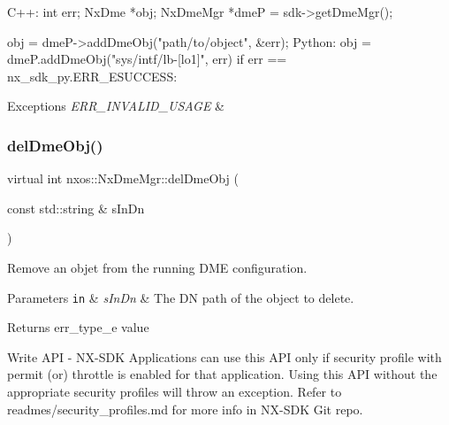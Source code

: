 \begin{DoxyCode}
C++:
    \textcolor{keywordtype}{int}   err;
    NxDme *obj;
    NxDmeMgr       *dmeP =  sdk->getDmeMgr();
    
    obj = dmeP->addDmeObj(\textcolor{stringliteral}{"path/to/object"}, &err);
Python:
    obj = dmeP.addDmeObj(\textcolor{stringliteral}{"sys/intf/lb-[lo1]"}, err)
    \textcolor{keywordflow}{if} err == nx\_sdk\_py.ERR\_ESUCCESS:
\end{DoxyCode}



\begin{DoxyExceptions}{Exceptions}
{\em E\+R\+R\+\_\+\+I\+N\+V\+A\+L\+I\+D\+\_\+\+U\+S\+A\+GE} & \\
\hline
\end{DoxyExceptions}
\mbox{\label{classnxos_1_1_nx_dme_mgr_ae29687ce5a8ac402e1297bb3c8528936}} 
\subsubsection{\texorpdfstring{del\+Dme\+Obj()}{delDmeObj()}}
{\footnotesize\ttfamily virtual int nxos\+::\+Nx\+Dme\+Mgr\+::del\+Dme\+Obj (\begin{DoxyParamCaption}\item[{const std\+::string \&}]{s\+In\+Dn }\end{DoxyParamCaption})\hspace{0.3cm}{\ttfamily [pure virtual]}}

Remove an objet from the running D\+ME configuration. 
\begin{DoxyParams}[1]{Parameters}
\mbox{\tt in}  & {\em s\+In\+Dn} & The DN path of the object to delete.\\
\hline
\end{DoxyParams}
\begin{DoxyReturn}{Returns}
err\+\_\+type\+\_\+e value
\end{DoxyReturn}
\begin{DoxyVerb}Write API - NX-SDK Applications can use this API only if security profile with permit (or) throttle is 
            enabled for that application. Using this API without the appropriate security profiles will
            throw an exception. Refer to readmes/security_profiles.md for more info in NX-SDK Git repo.
\end{DoxyVerb}



